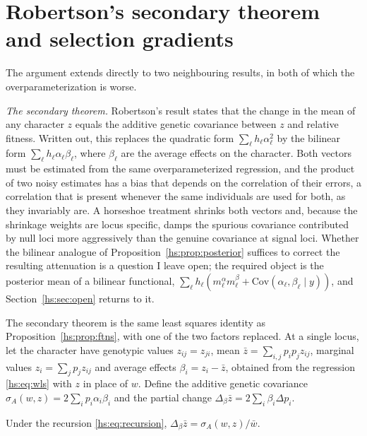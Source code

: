 \section{Robertson's secondary theorem and selection gradients}
\label{hs:sec:secondary}

The argument extends directly to two neighbouring results, in both of which the overparameterization is worse.

\emph{The secondary theorem.} Robertson's result \citep{hs:robertson1966mathematical} states that the change in the mean of any character $z$ equals the additive genetic covariance between $z$ and relative fitness. Written out, this replaces the quadratic form $\sum_\ell h_\ell \alpha_\ell^2$ by the bilinear form $\sum_\ell h_\ell \alpha_\ell \beta_\ell$, where $\beta_\ell$ are the average effects on the character. Both vectors must be estimated from the same overparameterized regression, and the product of two noisy estimates has a bias that depends on the correlation of their errors, a correlation that is present whenever the same individuals are used for both, as they invariably are. A horseshoe treatment shrinks both vectors and, because the shrinkage weights are locus specific, damps the spurious covariance contributed by null loci more aggressively than the genuine covariance at signal loci. Whether the bilinear analogue of Proposition~\ref{hs:prop:posterior} suffices to correct the resulting attenuation is a question I leave open; the required object is the posterior mean of a bilinear functional, $\sum_\ell h_\ell(m^\alpha_\ell m^\beta_\ell + \mathrm{Cov}(\alpha_\ell,\beta_\ell \mid y))$, and Section~\ref{hs:sec:open} returns to it.

The secondary theorem is the same least squares identity as Proposition~\ref{hs:prop:ftns}, with one of the two factors replaced. At a single locus, let the character have genotypic values $z_{ij} = z_{ji}$, mean $\bar z = \sum_{i,j}p_ip_jz_{ij}$, marginal values $z_i = \sum_jp_jz_{ij}$ and average effects $\beta_i = z_i - \bar z$, obtained from the regression \eqref{hs:eq:wls} with $z$ in place of $w$. Define the additive genetic covariance $\sigma_A(w,z) = 2\sum_ip_i\alpha_i\beta_i$ and the partial change $\Delta_\beta\bar z = 2\sum_i\beta_i\Delta p_i$.

\begin{proposition}
\label{hs:prop:robertson}
Under the recursion \eqref{hs:eq:recursion}, $\Delta_\beta\bar z = \sigma_A(w,z)/\bar w$.
\end{proposition}

